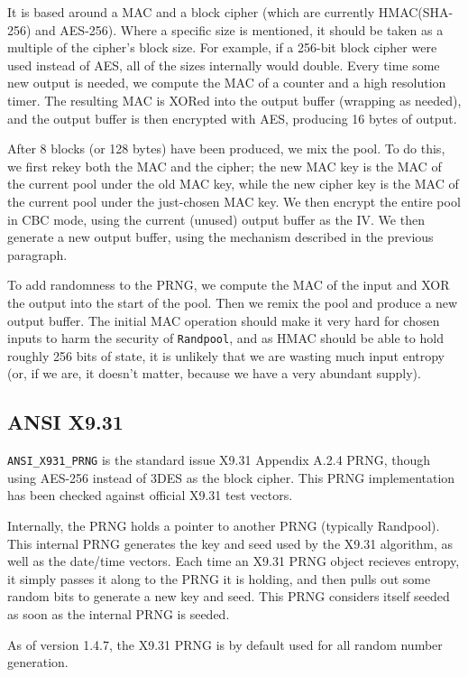 \documentclass{article}
\newcommand{\type}[1]{\texttt{#1}}
\begin{document}
It is based around a MAC and a block cipher (which are currently HMAC(SHA-256)
and AES-256). Where a specific size is mentioned, it should be taken as a
multiple of the cipher's block size. For example, if a 256-bit block cipher
were used instead of AES, all of the sizes internally would double. Every time
some new output is needed, we compute the MAC of a counter and a high
resolution timer. The resulting MAC is XORed into the output buffer (wrapping
as needed), and the output buffer is then encrypted with AES, producing 16
bytes of output.

After 8 blocks (or 128 bytes) have been produced, we mix the pool. To do this,
we first rekey both the MAC and the cipher; the new MAC key is the MAC of the
current pool under the old MAC key, while the new cipher key is the MAC of the
current pool under the just-chosen MAC key. We then encrypt the entire pool in
CBC mode, using the current (unused) output buffer as the IV. We then generate
a new output buffer, using the mechanism described in the previous paragraph.

To add randomness to the PRNG, we compute the MAC of the input and XOR the
output into the start of the pool. Then we remix the pool and produce a new
output buffer. The initial MAC operation should make it very hard for chosen
inputs to harm the security of \type{Randpool}, and as HMAC should be able to
hold roughly 256 bits of state, it is unlikely that we are wasting much input
entropy (or, if we are, it doesn't matter, because we have a very abundant
supply).

\subsection{ANSI X9.31}

\type{ANSI\_X931\_PRNG} is the standard issue X9.31 Appendix A.2.4 PRNG, though
using AES-256 instead of 3DES as the block cipher. This PRNG implementation has
been checked against official X9.31 test vectors.

Internally, the PRNG holds a pointer to another PRNG (typically
Randpool). This internal PRNG generates the key and seed used by the
X9.31 algorithm, as well as the date/time vectors. Each time an X9.31
PRNG object recieves entropy, it simply passes it along to the PRNG it
is holding, and then pulls out some random bits to generate a new key
and seed. This PRNG considers itself seeded as soon as the internal
PRNG is seeded.

As of version 1.4.7, the X9.31 PRNG is by default used for all random number
generation.
\end{document}
